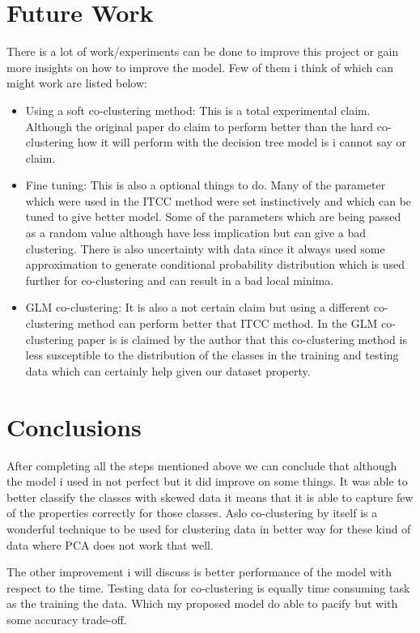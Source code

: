 \documentclass{acm_proc_article-sp}
\begin{document}
\section{Future Work}
There is a lot of work/experiments can be done to improve this project or gain more insights on how to improve the model. Few of them i think of which can might work are listed below:
\begin{itemize}
	\item Using a soft co-clustering method: This is a total experimental claim. Although the original paper do claim to perform better than the hard co-clustering how it will perform with the decision tree model is i cannot say or claim. 
	\item Fine tuning: This is also a optional things to do. Many of the parameter which were used in the ITCC method were set instinctively and which can be tuned to give better model. Some of the parameters which are being passed as a random value although have less implication but can give a bad clustering. There is also uncertainty with  data since it always used some approximation to generate conditional probability distribution which is used further for co-clustering and can result in a bad local minima. 
	\item GLM co-clustering: It is also a not certain claim but using a different co-clustering method can perform better that ITCC method. In the GLM co-clustering paper is is claimed by the author that this co-clustering method is less susceptible to the distribution of the classes in the training and testing data which can certainly help given our dataset property\cite{glm}. 
\end{itemize}

\section{Conclusions}
After completing all the steps mentioned above we can conclude that although the model i used in not perfect but it did improve on some things. It was able to better classify the classes with skewed data it means that it is able to capture few of the properties correctly for those classes. Aslo co-clustering by itself is a wonderful technique to be used for clustering data in better way for these kind of data where PCA does not work that well. 

The other improvement i will discuss is better performance of the model with respect to the time. Testing data for co-clustering is equally time consuming task as the training the data. Which my proposed model do able to pacify but with some accuracy trade-off.
\end{document}
